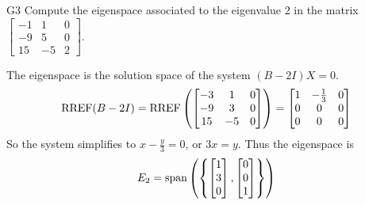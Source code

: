 \documentclass{sbgLAquiz}
\begin{document}
\begin{extract}\newpage\end{extract}
\begin{problem}{G3}
Compute the eigenspace associated to the eigenvalue $2$ in the matrix $\begin{bmatrix} -1 & 1 & 0 \\ -9 & 5 & 0 \\ 15 & -5 & 2 \end{bmatrix}$.
\end{problem}

\begin{solution}
The eigenspace is the solution space of the system $(B-2I)X=0$.
$$\operatorname{RREF}(B-2I)=\operatorname{RREF}\left(\begin{bmatrix} -3 & 1 & 0 \\ -9 & 3 & 0 \\ 15 & - 5 & 0 \end{bmatrix} \right) = \begin{bmatrix} 1 & -\frac{1}{3} & 0 \\ 0 & 0 & 0 \\ 0 & 0 & 0 \end{bmatrix}$$
So the system simplifies to $x-\frac{y}{3}=0$, or $3x=y$.  Thus the eigenspace is $$E_2 = {\rm span}\left( \left\{ \begin{bmatrix} 1 \\ 3 \\ 0 \end{bmatrix}, \begin{bmatrix} 0 \\ 0 \\ 1\end{bmatrix} \right\} \right)$$
\end{solution}
\end{document}
